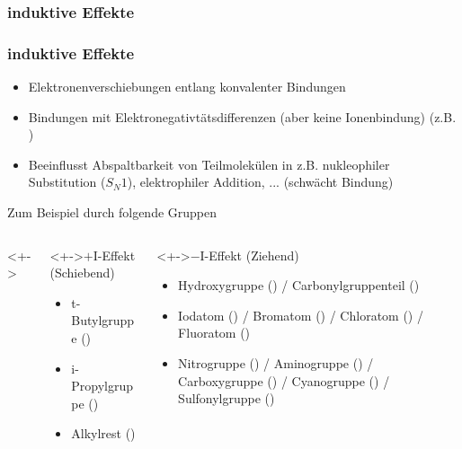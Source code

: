 \subsubsection{induktive Effekte}
\begin{frame}
\frametitle{induktive Effekte}
\begin{itemize}
	\item<+-> Elektronenverschiebungen entlang konvalenter Bindungen
	\item<+-> Bindungen mit Elektronegativtätsdifferenzen (aber keine Ionenbindung) (z.B. )
	\item<+-> Beeinflusst Abspaltbarkeit von Teilmolekülen in z.B. nukleophiler Substitution ($S_N1$), elektrophiler Addition, ... (schwächt Bindung)
\end{itemize}
\pause
Zum Beispiel durch folgende Gruppen
\vspace*{-20pt}
\begin{columns}<+->
\begin{column}{0.48\textwidth}
\begin{block}<+->{$+\text{I}$-Effekt (Schiebend)}
\begin{itemize}
	\item<+-> t-Butylgruppe ()
	\item<+-> i-Propylgruppe ()
	\item<+-> Alkylrest ()
\end{itemize}
\end{block}
\end{column}
\begin{column}{0.48\textwidth}
\begin{block}<+->{$-\text{I}$-Effekt (Ziehend)}
\begin{itemize}
	\item<+-> Hydroxygruppe () / Carbonylgruppenteil ()
	\item<+-> Iodatom () / Bromatom () / Chloratom () / Fluoratom ()
	\item<+-> Nitrogruppe () / Aminogruppe () / Carboxygruppe () / Cyanogruppe () / Sulfonylgruppe ()
\end{itemize}
\end{block}
\end{column}
\end{columns}
\end{frame}
